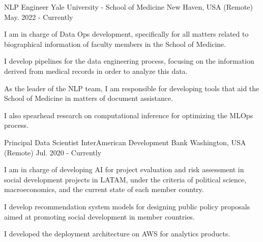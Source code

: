 

\begin{cventries}

  \cventry
    {NLP Engineer} %
    {Yale University - School of Medicine} %
    {New Haven, USA (Remote)} %
    {May. 2022 - Currently} %
    {
      \begin{cvitems} %
        \item {I am in charge of Data Ops development, specifically for all matters related to biographical information of faculty members in the School of Medicine.}
        \item {I develop pipelines for the data engineering process, focusing on the information derived from medical records in order to analyze this data.}
        \item {As the leader of the NLP team, I am responsible for developing tools that aid the School of Medicine in matters of document assistance.}
        \item {I also spearhead research on computational inference for optimizing the MLOps process.}
      \end{cvitems}
    }

  \cventry
    {Principal Data Scientist} %
    {InterAmerican Development Bank} %
    {Washington, USA (Remote)} %
    {Jul. 2020 - Currently} %
    {
      \begin{cvitems} %
        \item {I am in charge of developing AI for project evaluation and risk assessment in social development projects in LATAM, under the criteria of political science, macroeconomics, and the current state of each member country.}
        \item {I develop recommendation system models for designing public policy proposals aimed at promoting social development in member countries.}
        \item {I developed the deployment architecture on AWS for analytics products.}
      \end{cvitems}
    }


\end{cventries}
